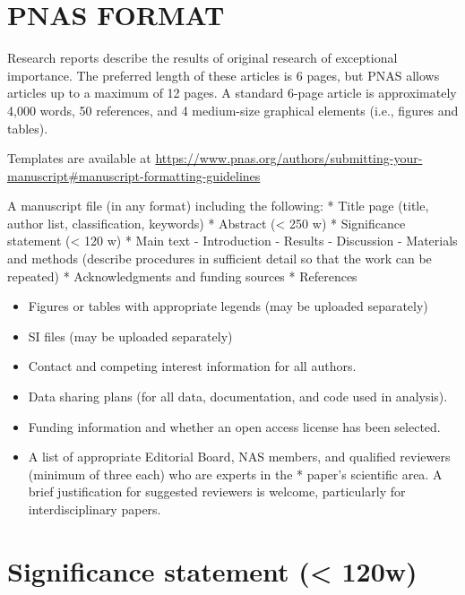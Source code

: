 \documentclass[
]{article}
\providecommand{\tightlist}{%
  \setlength{\itemsep}{0pt}\setlength{\parskip}{0pt}}
\begin{document}
\clearpage

\hypertarget{pnas-format}{%
\section{PNAS FORMAT}\label{pnas-format}}

Research reports describe the results of original research of
exceptional importance. The preferred length of these articles is 6
pages, but PNAS allows articles up to a maximum of 12 pages. A standard
6-page article is approximately 4,000 words, 50 references, and 4
medium-size graphical elements (i.e., figures and tables).

Templates are available at
\url{https://www.pnas.org/authors/submitting-your-manuscript\#manuscript-formatting-guidelines}

A manuscript file (in any format) including the following: * Title page
(title, author list, classification, keywords) * Abstract (\textless{}
250 w) * Significance statement (\textless{} 120 w) * Main text -
Introduction - Results - Discussion - Materials and methods (describe
procedures in sufficient detail so that the work can be repeated) *
Acknowledgments and funding sources * References

\begin{itemize}
\tightlist
\item
  Figures or tables with appropriate legends (may be uploaded
  separately)
\item
  SI files (may be uploaded separately)
\item
  Contact and competing interest information for all authors.
\item
  Data sharing plans (for all data, documentation, and code used in
  analysis).
\item
  Funding information and whether an open access license has been
  selected.
\item
  A list of appropriate Editorial Board, NAS members, and qualified
  reviewers (minimum of three each) who are experts in the * paper's
  scientific area. A brief justification for suggested reviewers is
  welcome, particularly for interdisciplinary papers.
\end{itemize}

\hypertarget{significance-statement-120w}{%
\section{Significance statement (\textless{}
120w)}\label{significance-statement-120w}}
\end{document}
